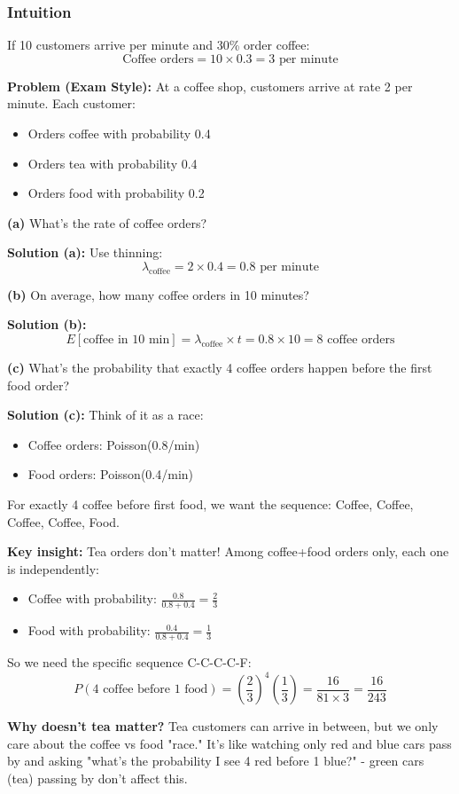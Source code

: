 \documentclass[10pt,letterpaper]{article}
\begin{document}
\subsubsection{Intuition}

If 10 customers arrive per minute and 30\% order coffee:
\[
\text{Coffee orders} = 10 \times 0.3 = 3 \text{ per minute}
\]

\begin{examplebox}
\textbf{Problem (Exam Style):} At a coffee shop, customers arrive at rate 2 per minute. Each customer:
\begin{itemize}
  \item Orders coffee with probability 0.4
  \item Orders tea with probability 0.4
  \item Orders food with probability 0.2
\end{itemize}

\textbf{(a)} What's the rate of coffee orders?

\textbf{Solution (a):} Use thinning:
\[
\lambda_{\text{coffee}} = 2 \times 0.4 = \boxed{0.8 \text{ per minute}}
\]

\textbf{(b)} On average, how many coffee orders in 10 minutes?

\textbf{Solution (b):}
\[
E[\text{coffee in 10 min}] = \lambda_{\text{coffee}} \times t = 0.8 \times 10 = \boxed{8 \text{ coffee orders}}
\]

\textbf{(c)} What's the probability that exactly 4 coffee orders happen before the first food order?

\textbf{Solution (c):} Think of it as a race:
\begin{itemize}
  \item Coffee orders: Poisson(0.8/min)
  \item Food orders: Poisson(0.4/min)
\end{itemize}

For exactly 4 coffee before first food, we want the sequence: Coffee, Coffee, Coffee, Coffee, Food.

\textbf{Key insight:} Tea orders don't matter! Among coffee+food orders only, each one is independently:
\begin{itemize}
  \item Coffee with probability: $\frac{0.8}{0.8+0.4} = \frac{2}{3}$
  \item Food with probability: $\frac{0.4}{0.8+0.4} = \frac{1}{3}$
\end{itemize}

So we need the specific sequence C-C-C-C-F:
\[
P(\text{4 coffee before 1 food}) = \left(\frac{2}{3}\right)^4 \left(\frac{1}{3}\right) = \frac{16}{81 \times 3} = \boxed{\frac{16}{243}}
\]

\textbf{Why doesn't tea matter?} Tea customers can arrive in between, but we only care about the coffee vs food "race." It's like watching only red and blue cars pass by and asking "what's the probability I see 4 red before 1 blue?" - green cars (tea) passing by don't affect this.
\end{examplebox}
\end{document}
